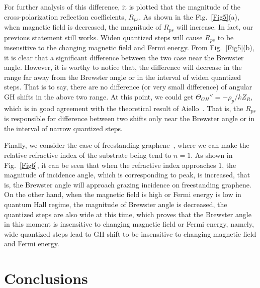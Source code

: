 \documentclass[twocolumn,showpacs,preprintnumbers,amsmath,amssymb]{revtex4}
\begin{document}
For further analysis of this difference,
it is plotted that the magnitude of the cross-polarization reflection coefficients,
$R_{ps}$. As shown in the Fig.~\ref{Fig5}(a), when magnetic field is decreased,
the magnitude of $R_{ps}$ will increase. In fact,
our previous statement still works.
Widen quantized steps will cause $R_{ps}$ to be insensitive to the changing magnetic field and Fermi energy.
From Fig.~\ref{Fig5}(b),
it is clear that a significant difference between the two case near the Brewster angle.
However, it is worthy to notice that, the difference will
decrease in the range far away from the Brewster angle or in the interval of widen quantized steps. That is to say,
there are no difference (or very small difference) of angular GH shifts in the above two range.
At this point, we could get
$\Theta_{GH}''=-\rho_{p}/kZ_R$, which is in good agreement with the
theoretical result of Aiello~\cite{Aiello2008}.
That is, the $R_{ps}$ is responsible for
difference between two shifts only near the Brewster angle or in the interval of narrow quantized steps.

Finally, we consider the case of freestanding graphene~\cite{Liu2017},
where we can make the relative refractive index
of the substrate being tend to $n=1$.
As shown in Fig.~\ref{Fig6},
it can be seen that when the refractive index approaches $1$,
the magnitude of incidence angle, which is corresponding to peak, is increased, that is,
the Brewster angle will approach grazing incidence on freestanding graphene.
On the other hand,
when the magnetic field is high or Fermi energy is low in quantum Hall regime,
the magnitude of Brewster angle is decreased,
the quantized steps are also wide at this time,
which proves that the Brewster angle in this moment is insensitive to changing magnetic field or Fermi energy,
namely, wide quantized steps lead to GH shift to be insensitive to changing magnetic field and Fermi energy.


\section{Conclusions}
\end{document}
